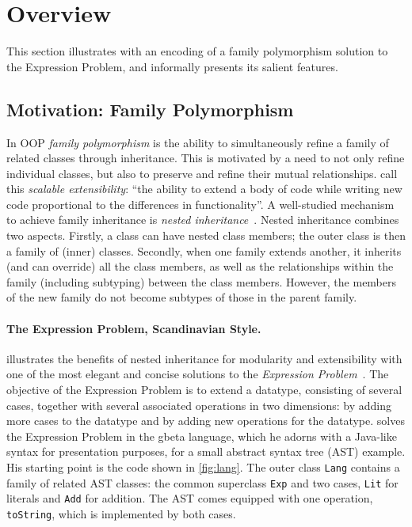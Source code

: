 
\section{Overview}
\label{sec:overview}

This section illustrates \name with an encoding of a family polymorphism
solution to the Expression Problem, and informally presents its salient
features.

\subsection{Motivation: Family Polymorphism}

In OOP \emph{family polymorphism} is the ability to
simultaneously refine a family of related classes through inheritance. This is
motivated by a need to not only refine individual classes, but also to preserve
and refine their mutual relationships. \citet{Nystrom_2004} call this
\emph{scalable extensibility}: ``the ability to extend a body of code while
writing new code proportional to the differences in functionality''.
%
A well-studied mechanism to achieve family inheritance is \emph{nested
inheritance}~\citep{Nystrom_2004}. Nested inheritance combines two aspects.
Firstly, a class can have nested class members; the outer class is then a
family of (inner) classes. Secondly, when one family extends another, it
inherits (and can override) all the class members, as well as the relationships
within the family (including subtyping) between the class members. However,
the members of the new family do not become subtypes of those in the parent family.

\paragraph{The Expression Problem, Scandinavian Style.}
\citet{Ernst_2001} illustrates the benefits of nested inheritance for modularity
and extensibility with one of the most elegant and concise solutions to the
\emph{Expression Problem}~\citep{wadler1998expression}. The objective of the
Expression Problem is to extend a datatype, consisting of several cases,
together with several associated operations in two dimensions: by adding more
cases to the datatype and by adding new operations for the datatype.
\citeauthor{Ernst_2001} solves the Expression Problem in the gbeta language,
which he adorns with a Java-like syntax for presentation purposes, for a small
abstract syntax tree (AST) example. His starting point is the code shown in
\cref{fig:lang}. The outer class \lstinline{Lang} contains a family of related
AST classes: the common superclass \lstinline{Exp} and two cases,
\lstinline{Lit} for literals and \lstinline{Add} for addition. The AST comes
equipped with one operation, \lstinline{toString}, which is implemented by both
cases.


